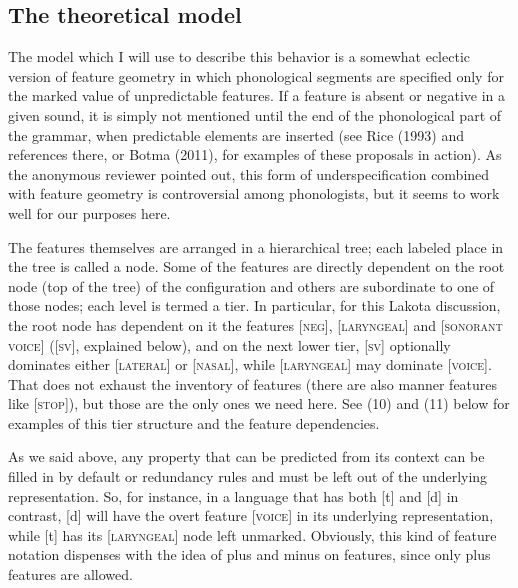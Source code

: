 \documentclass[output=paper]{LSP/langsci}
\begin{document}
\subsection{The theoretical model}

The model which I will use to describe this behavior is a somewhat eclectic version of feature geometry in which phonological segments are specified only for the marked value of unpredictable features. If a feature is absent or negative in a given sound, it is simply not mentioned until the end of the phonological part of the grammar, when predictable elements are inserted (see Rice (1993) and references there, or Botma (2011), for examples of these proposals in action). As the anonymous reviewer pointed out, this form of underspecification combined with feature geometry is controversial among phonologists, but it seems to work well for our purposes here.

The features themselves are arranged in a hierarchical tree; each labeled place in the tree is called a node. Some of the features are directly dependent on the root node (top of the tree) of the configuration and others are subordinate to one of those nodes; each level is termed a tier. In particular, for this Lakota discussion, the root node has dependent on it the features [\textsc{neg}], [\textsc{laryngeal}] and [\textsc{sonorant voice}] ([\textsc{sv}], explained below), and on the next lower tier, [\textsc{sv}] optionally dominates either [\textsc{lateral}] or [\textsc{nasal}], while [\textsc{laryngeal}] may dominate [\textsc{voice}]. That does not exhaust the inventory of features (there are also manner features like [\textsc{stop}]), but those are the only ones we need here. See (10) and (11) below for examples of this tier structure and the feature dependencies.

As we said above, any property that can be predicted from its context can be filled in by default or redundancy rules and must be left out of the underlying representation. So, for instance, in a language that has both [t] and [d] in contrast, [d] will have the overt feature [\textsc{voice}] in its underlying representation, while [t] has its [\textsc{laryngeal}] node left unmarked. Obviously, this kind of feature notation dispenses with the idea of plus and minus on features, since only plus features are allowed.
\end{document}
